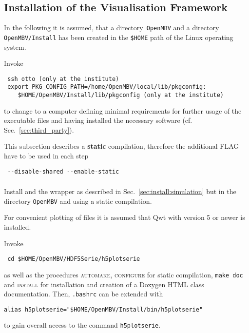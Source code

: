 \subsection{Installation of the Visualisation Framework\label{sec:install:visualisation}}
In the following it is assumed, that a directory~\texttt{OpenMBV} and a directory \texttt{OpenMBV/Install} has been created in the \texttt{\$HOME} path of the Linux operating system.\par
%
Invoke 
\begin{verbatim}
 ssh otto (only at the institute)
 export PKG_CONFIG_PATH=/home/OpenMBV/local/lib/pkgconfig:
    $HOME/OpenMBV/Install/lib/pkgconfig (only at the institute)
\end{verbatim}
to change to a computer defining minimal requirements for further usage of the executable files and having installed the necessary software (cf. Sec.~\ref{sec:third_party}).

This subsection describes a \textbf{static} compilation, therefore the additional FLAG have to be used in each step
\begin{verbatim}
 --disable-shared --enable-static
\end{verbatim}

\subsubsection{\HDF}
Install \HDF{} and the \HDF{} wrapper as described in Sec.~\ref{sec:install:simulation} but in the directory \texttt{OpenMBV} and using a static compilation.\par
For convenient plotting of \HDF{} files it is assumed that Qwt with version 5 or newer is installed.\par
Invoke 
\begin{verbatim}
 cd $HOME/OpenMBV/HDF5Serie/h5plotserie
\end{verbatim}
as well as the procedures \textsc{automake, configure} for static compilation, \texttt{make doc} and \textsc{install} for installation and creation of a Doxygen HTML class documentation. Then, \texttt{.bashrc} can be extended with
\begin{verbatim}
alias h5plotserie="$HOME/OpenMBV/Install/bin/h5plotserie"
\end{verbatim}
to gain overall access to the command \texttt{h5plotserie}.

\subsubsection{\OpenMBV{}}
